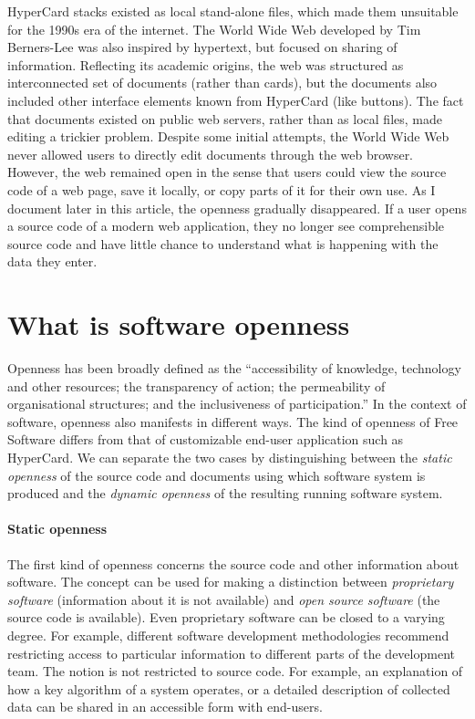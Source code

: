 HyperCard stacks existed as local stand-alone files, which made them unsuitable for the
1990s era of the internet. The World Wide Web developed by Tim Berners-Lee
was also inspired by hypertext, but focused on sharing of information.
Reflecting its academic origins, the web was structured as interconnected set of
documents (rather than cards), but the documents also included other interface elements known from
HyperCard (like buttons). The fact that documents existed on public web servers, rather than
as local files, made editing a trickier problem. Despite some initial attempts, the World
Wide Web never allowed users to directly edit documents through the web browser. However,
the web remained open in the sense that users could view the source code of a web
page, save it locally, or copy parts of it for their own use. As I document later in this
article, the openness gradually disappeared. If a user opens a source code of a modern
web application, they no longer see comprehensible source code and have little chance
to understand what is happening with the data they enter.


\section{What is software openness}
\label{sec:openness}

Openness has been broadly defined as the ``accessibility of knowledge, technology and other
resources; the transparency of action; the permeability of organisational structures; and the
inclusiveness of participation.'' In the context of
software, openness also manifests in different ways. The kind of openness of Free Software
differs from that of customizable end-user application such as HyperCard. We can separate the
two cases by distinguishing between the \emph{static openness} of the source code and documents
using which software system is produced and the \emph{dynamic openness} of the resulting
running software system.

\paragraph{Static openness}
The first kind of openness concerns the source code and other information about software.
The concept can be used for making a distinction between \emph{proprietary software} (information
about it is not available) and \emph{open source software} (the source code is available). Even
proprietary software can be closed to a varying degree. For example, different software development
methodologies recommend restricting access to particular information to different parts of the
development team. The notion is not restricted to source code. For example, an explanation of how
a key algorithm of a system operates, or a detailed description of collected data can be shared
in an accessible form with end-users.

